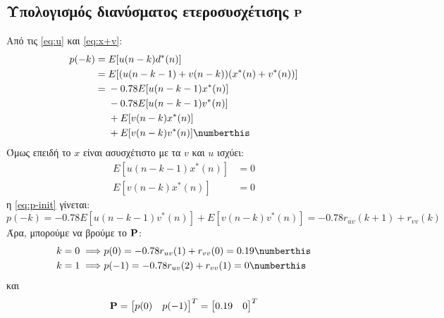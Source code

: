 \subsection{Υπολογισμός διανύσματος ετεροσυσχέτισης $\mathbf{P}$}
Από τις \eqref{eq:u} και \eqref{eq:x+v}:
\begin{align*}
p(-k) ={}& E[u(n - k) d^*(n)]\\
={}& E[(u(n - k - 1) + v(n - k)) (x^*(n) + v^*(n))]\\
={}& -0.78E[u(n - k - 1) x^*(n)]\\
& -0.78E[u(n - k - 1) v^*(n)]\\
& + E[v(n - k) x^*(n)]\\
& + E[v(n - k) v^*(n)]
\numberthis\label{eq:p-init}
\end{align*}
Όμως επειδή το $x$ είναι ασυσχέτιστο με τα $v$ και $u$ ισχύει:
\begin{align*}
E[u(n - k - 1) x^*(n)] &= 0\\
E[v(n - k) x^*(n)] &= 0
\end{align*}
η \eqref{eq:p-init} γίνεται:
\begin{equation}
p(-k) = -0.78E[u(n - k - 1) v^*(n)] + E[v(n - k) v^*(n)] = -0.78r_{uv}(k + 1) + r_{vv}(k)
\end{equation}
Άρα, μπορούμε να βρούμε το $\mathbf{P}$:
\begin{align*}
k = 0 \implies& p(0) = -0.78r_{uv}(1) + r_{vv}(0) = 0.19\numberthis\\
k = 1 \implies& p(-1) = -0.78r_{uv}(2) + r_{vv}(1) = 0\numberthis
\end{align*}
και
\begin{equation}
\mathbf{P} = \begin{bmatrix} p(0) & p(-1)\end{bmatrix}^T = \begin{bmatrix} 0.19 & 0\end{bmatrix}^T
\end{equation}
